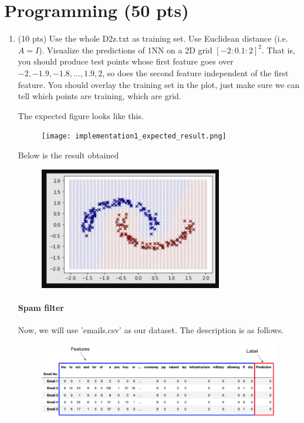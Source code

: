 \documentclass[a4paper]{article}
\theoremstyle{definition}
\begin{document}
\section{Programming (50 pts)}
\begin{enumerate}
	\item (10 pts) Use the whole D2z.txt as training set.  Use Euclidean distance (i.e. $A=I$).
	Visualize the predictions of 1NN on a 2D grid $[-2:0.1:2]^2$.
	That is, you should produce test points whose first feature goes over $-2, -1.9, -1.8, \ldots, 1.9, 2$, so does the second feature independent of the first feature.
	You should overlay the training set in the plot, just make sure we can tell which points are training, which are grid.
	
	The expected figure looks like this.
	\begin{figure}[h]
		\centering
		\texttt{[image: implementation1\_expected\_result.png]}
	\end{figure}
 Below is the result obtained
        \begin{figure}[h]
		\centering
		\includegraphics[width=8cm]{2.1.png}
	\end{figure}
        
	
	\paragraph{Spam filter} Now, we will use 'emails.csv' as our dataset. The description is as follows.
	\begin{figure}[h]
		\centering
		\includegraphics[width=\linewidth]{email_head.png}
	\end{figure}
	

\end{enumerate}
\end{document}
